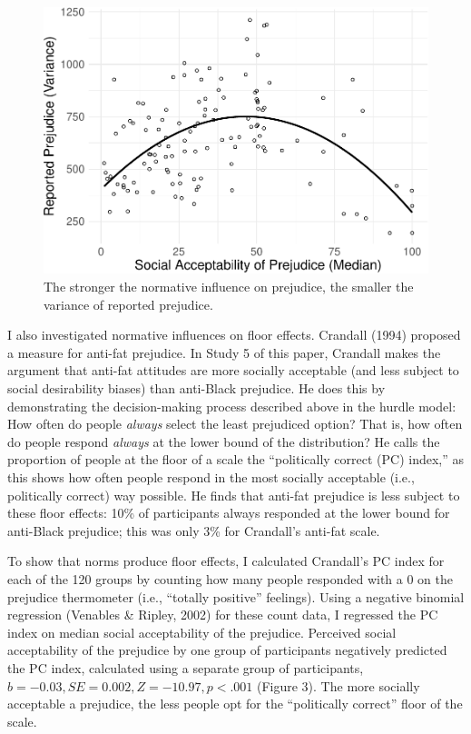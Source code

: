 \documentclass[english,man]{apa6}
\theoremstyle{definition}
\theoremstyle{definition}
\theoremstyle{remark}
\begin{document}
\begin{figure}
\centering
\includegraphics{beta_hurdle_files/figure-latex/unnamed-chunk-3-1.pdf}
\caption{\label{fig:unnamed-chunk-3}The stronger the normative influence on
prejudice, the smaller the variance of reported prejudice.}
\end{figure}

I also investigated normative influences on floor effects. Crandall
(1994) proposed a measure for anti-fat prejudice. In Study 5 of this
paper, Crandall makes the argument that anti-fat attitudes are more
socially acceptable (and less subject to social desirability biases)
than anti-Black prejudice. He does this by demonstrating the
decision-making process described above in the hurdle model: How often
do people \emph{always} select the least prejudiced option? That is, how
often do people respond \emph{always} at the lower bound of the
distribution? He calls the proportion of people at the floor of a scale
the \enquote{politically correct (PC) index,} as this shows how often
people respond in the most socially acceptable (i.e., politically
correct) way possible. He finds that anti-fat prejudice is less subject
to these floor effects: 10\% of participants always responded at the
lower bound for anti-Black prejudice; this was only 3\% for Crandall's
anti-fat scale.

To show that norms produce floor effects, I calculated Crandall's PC
index for each of the 120 groups by counting how many people responded
with a 0 on the prejudice thermometer (i.e., \enquote{totally positive}
feelings). Using a negative binomial regression (Venables \& Ripley,
2002) for these count data, I regressed the PC index on median social
acceptability of the prejudice. Perceived social acceptability of the
prejudice by one group of participants negatively predicted the PC
index, calculated using a separate group of participants,
\(b = -0.03, SE = 0.002, Z = -10.97, p < .001\) (Figure 3). The more
socially acceptable a prejudice, the less people opt for the
\enquote{politically correct} floor of the scale.
\end{document}
